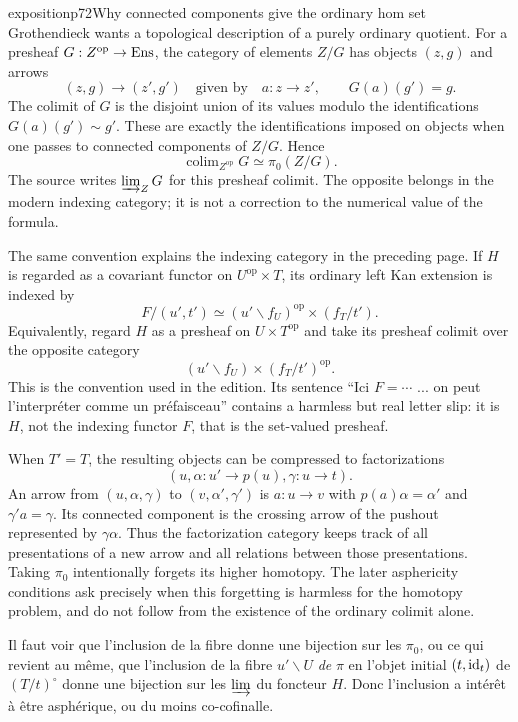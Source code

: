 \begin{dcomment}{exposition}{p72}{Why connected components give the ordinary hom set}
Grothendieck wants a topological description of a purely ordinary quotient. For a presheaf $G:Z^{\mathrm{op}}\to\mathrm{Ens}$, the category of elements $Z/G$ has objects $(z,g)$ and arrows
\[
 (z,g)\longrightarrow(z',g')\quad\text{given by}\quad
 a:z\longrightarrow z',\qquad G(a)(g')=g.
\]
The colimit of $G$ is the disjoint union of its values modulo the identifications $G(a)(g')\sim g'$. These are exactly the identifications imposed on objects when one passes to connected components of $Z/G$. Hence
\[
 \mathop{\mathrm{colim}}_{Z^{\mathrm{op}}}G\simeq\pi_0(Z/G).
\]
The source writes $\varinjlim_Z G$ for this presheaf colimit. The opposite belongs in the modern indexing category; it is not a correction to the numerical value of the formula.

The same convention explains the indexing category in the preceding page. If $H$ is regarded as a covariant functor on $U^{\mathrm{op}}\times T$, its ordinary left Kan extension is indexed by
\[
 F/(u',t')\simeq (u'\backslash f_U)^{\mathrm{op}}\times(f_T/t').
\]
Equivalently, regard $H$ as a presheaf on $U\times T^{\mathrm{op}}$ and take its presheaf colimit over the opposite category
\[
 (u'\backslash f_U)\times(f_T/t')^{\mathrm{op}}.
\]
This is the convention used in the edition. Its sentence ``Ici $F=\cdots$ ... on peut l'interpr\'eter comme un pr\'efaisceau'' contains a harmless but real letter slip: it is $H$, not the indexing functor $F$, that is the set-valued presheaf.

When $T'=T$, the resulting objects can be compressed to factorizations
\[
 (u,\alpha:u'\to p(u),\gamma:u\to t).
\]
An arrow from $(u,\alpha,\gamma)$ to $(v,\alpha',\gamma')$ is $a:u\to v$ with $p(a)\alpha=\alpha'$ and $\gamma'a=\gamma$. Its connected component is the crossing arrow of the pushout represented by $\gamma\alpha$. Thus the factorization category keeps track of all presentations of a new arrow and all relations between those presentations. Taking $\pi_0$ intentionally forgets its higher homotopy. The later asphericity conditions ask precisely when this forgetting is harmless for the homotopy problem, and do not follow from the existence of the ordinary colimit alone.
\end{dcomment}


Il faut voir que l'inclusion de la fibre donne une bijection sur les $\pi_0$, ou ce qui revient au même, que l'inclusion de la fibre $u'\backslash U$ \textit{de} $\pi$ en l'objet initial $(t,\mathrm{id}_t)$ de $(T/t)^{\circ}$ donne une bijection sur les $\varinjlim$ du foncteur $H$. Donc l'inclusion a intérêt à être asphérique, ou du moins co-cofinalle. %

